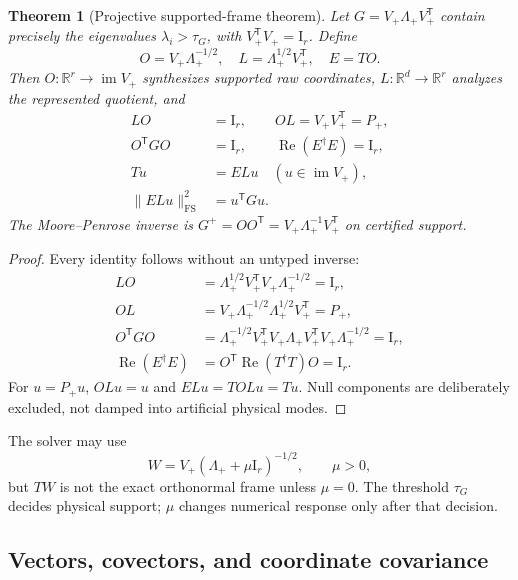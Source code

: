 \documentclass[10pt,twocolumn]{article}
\newtheorem{theorem}{Theorem}[section]
\theoremstyle{definition}
\theoremstyle{remark}
\newcommand{\R}{\mathbb R}
\newcommand{\Id}{\mathrm I}
\newcommand{\Rea}{\operatorname{Re}}
\newcommand{\im}{\operatorname{im}}
\newcommand{\FS}{\mathrm{FS}}
\begin{document}
\begin{theorem}[Projective supported-frame theorem]
Let $G=V_+\Lambda_+V_+^{\mathsf T}$ contain precisely the eigenvalues $\lambda_i>\tau_G$, with $V_+^{\mathsf T}V_+=\Id_r$.  Define
\begin{equation}
 O=V_+\Lambda_+^{-1/2},\quad
 L=\Lambda_+^{1/2}V_+^{\mathsf T},\quad
 E=TO.
 \label{eq:whitening}
\end{equation}
Then $O:\R^r\to\im V_+$ synthesizes supported raw coordinates, $L:\R^d\to\R^r$ analyzes the represented quotient, and
\begin{align}
 LO&=\Id_r,\qquad OL=V_+V_+^{\mathsf T}=P_+,\nonumber\\
 O^{\mathsf T}GO&=\Id_r,\qquad \Rea(E^\dagger E)=\Id_r,\nonumber\\
 Tu&=ELu\quad(u\in\im V_+),\nonumber\\
 \|ELu\|_{\FS}^2&=u^{\mathsf T}Gu.
 \label{eq:frameidentities}
\end{align}
The Moore--Penrose inverse is $G^+=O O^{\mathsf T}=V_+\Lambda_+^{-1}V_+^{\mathsf T}$ on certified support.
\end{theorem}

\begin{proof}
Every identity follows without an untyped inverse:
\begin{align}
 LO&=\Lambda_+^{1/2}V_+^{\mathsf T}V_+\Lambda_+^{-1/2}=\Id_r,\nonumber\\
 OL&=V_+\Lambda_+^{-1/2}\Lambda_+^{1/2}V_+^{\mathsf T}=P_+,\nonumber\\
 O^{\mathsf T}GO
 &=\Lambda_+^{-1/2}V_+^{\mathsf T}
   V_+\Lambda_+V_+^{\mathsf T}V_+\Lambda_+^{-1/2}=\Id_r,\nonumber\\
 \Rea(E^\dagger E)&=O^{\mathsf T}\Rea(T^\dagger T)O=\Id_r.
\end{align}
For $u=P_+u$, $OLu=u$ and $ELu=TOLu=Tu$.  Null components are deliberately excluded, not damped into artificial physical modes.
\end{proof}

The solver may use
\begin{equation}
 W=V_+(\Lambda_++\mu\Id_r)^{-1/2},\qquad \mu>0,
 \label{eq:ridge}
\end{equation}
but $TW$ is not the exact orthonormal frame unless $\mu=0$.  The threshold $\tau_G$ decides physical support; $\mu$ changes numerical response only after that decision.

\subsection{Vectors, covectors, and coordinate covariance}
\end{document}
